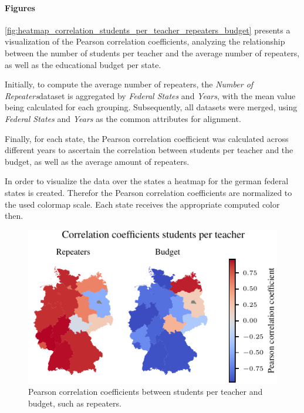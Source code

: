 \paragraph{Figures}
\autoref{fig:heatmap_correlation_students_per_teacher_repeaters_budget} presents a visualization of the Pearson correlation coefficients, analyzing the relationship between the number of students per teacher and the average number of repeaters, as well as the educational budget per state. 

Initially, to compute the average number of repeaters, the \textit{Number of Repeaters}dataset is aggregated by \textit{Federal States} and \textit{Years}, with the mean value being calculated for each grouping. Subsequently, all datasets were merged, using \textit{Federal States} and \textit{Years} as the common attributes for alignment. 

Finally, for each state, the Pearson correlation coefficient was calculated across different years to ascertain the correlation between students per teacher and the budget, as well as the average amount of repeaters.

In order to visualize the data over the states a heatmap for the german federal states is created. Therefor the Pearson correlation coefficients are normalized to the used colormap scale. Each state receives the appropriate computed color then.

\begin{figure}[h]
    \centering
    \includegraphics{fig/fig_heatmap_correlation_students_per_teacher_repeaters_budget.pdf}
    \caption{Pearson correlation coefficients between students per teacher and budget, such as repeaters.}
    \label{fig:heatmap_correlation_students_per_teacher_repeaters_budget}
\end{figure}
